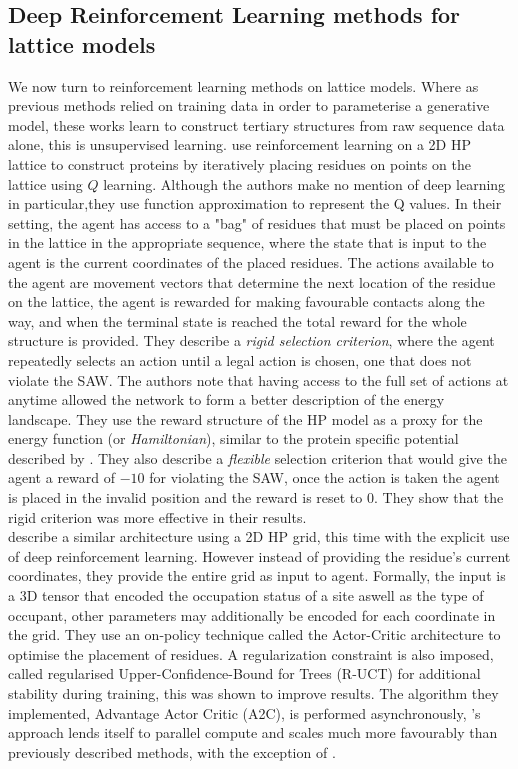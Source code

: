 \subsection{Deep Reinforcement Learning methods for lattice models}
We now turn to reinforcement learning methods on lattice models. Where as previous methods relied on
training data in order to parameterise a generative model, these works learn to construct tertiary structures
from raw sequence data alone, this is unsupervised learning.
\cite{Wu2019} use reinforcement learning on a 2D HP lattice to construct proteins by iteratively
placing residues on points on the lattice using $Q$ learning. Although the authors make no mention of
deep learning in particular,they use function approximation to represent the Q values. In their setting,
the agent has access to a "bag" of residues that must be placed on points in the lattice in the appropriate
sequence, where the state that is input to the agent is the current coordinates of the placed residues. 
The actions available to the agent are movement vectors that determine the next location of the residue on the 
lattice, the agent is rewarded for making favourable contacts along the way, and when the terminal state is reached
the total reward for the whole structure is provided. They describe a \emph{rigid selection criterion}, where the agent
repeatedly selects an action until a legal action is chosen, one that does not violate the SAW. The authors note that having access
to the full set of actions at anytime allowed the network to form a better description of the energy landscape. They 
use the reward structure of the HP model as a proxy for the energy function (or \emph{Hamiltonian}), similar to the 
protein specific potential described by \cite{Senior2020}. They also describe a \emph{flexible} selection criterion
that would give the agent a reward of $-10$ for violating the SAW, once the action is taken the agent is placed in the invalid
position and the reward is reset to 0. They show that the rigid criterion was more effective in their results.\\

\cite{Yanjun2018} describe a similar architecture using a 2D HP grid, this time with the explicit use of deep reinforcement learning.
However instead of providing the residue's current coordinates, they provide the entire grid as input to agent. Formally,
the input is a 3D tensor that encoded the occupation status of a site aswell as the type of occupant, other parameters may additionally be encoded
for each coordinate in the grid. They use an on-policy technique called the Actor-Critic architecture \cite{Mnih2016} to optimise the placement
of residues. A regularization constraint is also imposed, called regularised Upper-Confidence-Bound for Trees (R-UCT) for 
additional stability during training, this was shown to improve results. The algorithm they implemented, Advantage Actor Critic (A2C),
is performed asynchronously, \cite{Yanjun2018}'s approach lends itself to parallel compute and scales much more favourably than
previously described methods, with the exception of \cite{Senior2020,Yang2020}.

